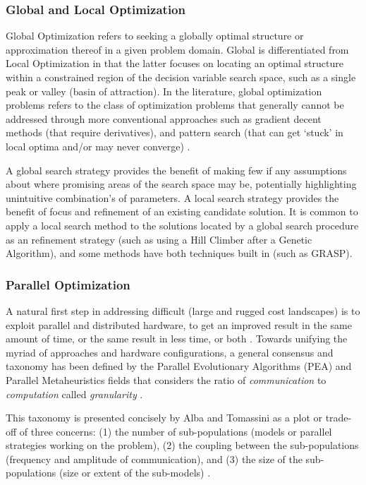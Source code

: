 \documentclass[a4paper, 11pt]{article}
\begin{document}
\subsubsection{Global and Local Optimization}
Global Optimization refers to seeking a globally optimal structure or approximation thereof in a given problem domain. Global is differentiated from Local Optimization in that the latter focuses on locating an optimal structure within a constrained region of the decision variable search space, such as a single peak or valley (basin of attraction). In the literature, global optimization problems refers to the class of optimization problems that generally cannot be addressed through more conventional approaches such as gradient decent methods (that require derivatives), and pattern search (that can get `stuck' in local optima and/or may never converge) \cite{Price1977, Toern1999}. 

A global search strategy provides the benefit of making few if any assumptions about where promising areas of the search space may be, potentially highlighting unintuitive combination's of parameters. A local search strategy provides the benefit of focus and refinement of an existing candidate solution. It is common to apply a local search method to the solutions located by a global search procedure as an refinement strategy (such as using a Hill Climber after a Genetic Algorithm), and some methods have both techniques built in (such as GRASP).
	
\subsubsection{Parallel Optimization}
A natural first step in addressing difficult (large and rugged cost landscapes) is to exploit parallel and distributed hardware, to get an improved result in the same amount of time, or the same result in less time, or both \cite{Crainic2005}. Towards unifying the myriad of approaches and hardware configurations, a general consensus and taxonomy has been defined by the Parallel Evolutionary Algorithms (PEA) and Parallel Metaheuristics fields that considers the ratio of \emph{communication} to \emph{computation} called \emph{granularity} \cite{Cantu-Paz2000, Alba2005a}. 

This taxonomy is presented concisely by Alba and Tomassini as a plot or trade-off of three concerns: (1) the number of sub-populations (models or parallel strategies working on the problem), (2) the coupling between the sub-populations (frequency and amplitude of communication), and (3) the size of the sub-populations (size or extent of the sub-models) \cite{Alba2002}. 
\end{document}
